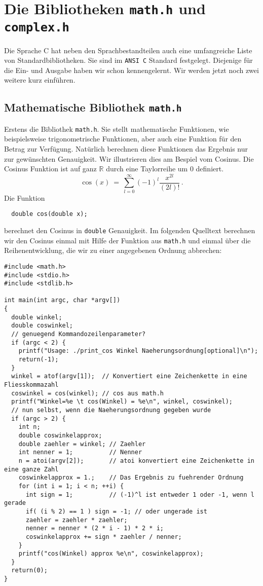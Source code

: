 \section{Die Bibliotheken \texttt{math.h} und \texttt{complex.h}}

Die Sprache C hat neben den Sprachbestandteilen auch eine umfangreiche Liste von Standardbibliotheken.
Sie sind im \texttt{ANSI C} Standard festgelegt.
Diejenige für die Ein- und Ausgabe haben wir schon kennengelernt.
Wir werden jetzt noch zwei weitere kurz einführen.

\subsection{Mathematische Bibliothek \texttt{math.h}}

Erstens die Bibliothek \texttt{math.h}.
Sie stellt mathematische Funktionen, wie beispielsweise trigonometrische Funktionen, aber auch eine Funktion für den Betrag zur Verfügung.
Natürlich berechnen diese Funktionen das Ergebnis nur zur gewünschten Genauigkeit.
Wir illustrieren dies am Bespiel vom Cosinus.
Die Cosinus Funktion ist auf ganz $\mathbb{R}$ durch eine Taylorreihe um 0 definiert.
\begin{equation}
  \label{eq:cos}
  \cos\left(x\right)\ =\ \sum_{l=0}^{\infty} \left(-1\right)^{l} \dfrac{x^{2l}}{\left(2l\right)!}\,.
\end{equation}
Die Funktion 
\begin{lstlisting}
  double cos(double x);
\end{lstlisting}
berechnet den Cosinus in \texttt{double} Genauigkeit.
Im folgenden Quelltext berechnen wir den Cosinus einmal mit Hilfe der Funktion aus \texttt{math.h} und einmal über die Reihenentwicklung, die wir zu einer angegebenen Ordnung abbrechen:
\begin{lstlisting}[caption={Beispiel zur Verwendung des Cosinus}, belowcaptionskip=0.3em]
#include <math.h>
#include <stdio.h>
#include <stdlib.h>

int main(int argc, char *argv[])
{
  double winkel;
  double coswinkel;
  // genuegend Kommandozeilenparameter?
  if (argc < 2) {
    printf("Usage: ./print_cos Winkel Naeherungsordnung[optional]\n");
    return(-1);
  }
  winkel = atof(argv[1]);  // Konvertiert eine Zeichenkette in eine Fliesskommazahl
  coswinkel = cos(winkel); // cos aus math.h
  printf("Winkel=%e \t cos(Winkel) = %e\n", winkel, coswinkel);
  // nun selbst, wenn die Naeherungsordnung gegeben wurde
  if (argc > 2) {
    int n;
    double coswinkelapprox;
    double zaehler = winkel; // Zaehler
    int nenner = 1;          // Nenner
    n = atoi(argv[2]);       // atoi konvertiert eine Zeichenkette in eine ganze Zahl
    coswinkelapprox = 1.;    // Das Ergebnis zu fuehrender Ordnung
    for (int i = 1; i < n; ++i) {
      int sign = 1;          // (-1)^l ist entweder 1 oder -1, wenn l gerade
      if( (i % 2) == 1 ) sign = -1; // oder ungerade ist
      zaehler = zaehler * zaehler;
      nenner = nenner * (2 * i - 1) * 2 * i;
      coswinkelapprox += sign * zaehler / nenner;
    }
    printf("cos(Winkel) approx %e\n", coswinkelapprox);
  }
  return(0);
}
\end{lstlisting}
